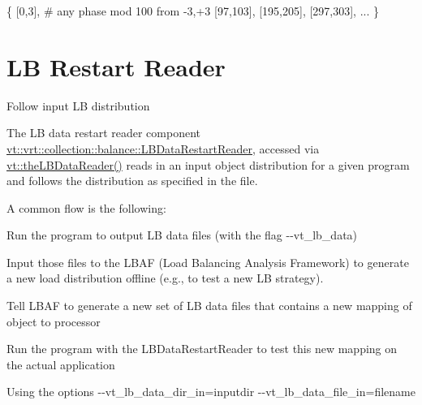 \begin{DoxyCode}
\{
  [0,3], # any phase mod 100 from -3,+3
  [97,103],
  [195,205],
  [297,303], ...
\}
\end{DoxyCode}
 \hypertarget{lb-data-reader}{}\section{LB Restart Reader}\label{lb-data-reader}
Follow input LB distribution

The LB data restart reader component {\ttfamily \hyperlink{structvt_1_1vrt_1_1collection_1_1balance_1_1_l_b_data_restart_reader}{vt\+::vrt\+::collection\+::balance\+::\+L\+B\+Data\+Restart\+Reader}}, accessed via {\ttfamily \hyperlink{namespacevt_a6dc000b04e41df77184588b50280b312}{vt\+::the\+L\+B\+Data\+Reader()}} reads in an input object distribution for a given program and follows the distribution as specified in the file.

A common flow is the following\+:
\begin{DoxyItemize}
\item Run the program to output LB data files (with the flag {\ttfamily -\/-\/vt\+\_\+lb\+\_\+data})
\item Input those files to the L\+B\+AF (Load Balancing Analysis Framework) to generate a new load distribution offline (e.\+g., to test a new LB strategy).
\begin{DoxyItemize}
\item Tell L\+B\+AF to generate a new set of LB data files that contains a new mapping of object to processor
\end{DoxyItemize}
\item Run the program with the {\ttfamily L\+B\+Data\+Restart\+Reader} to test this new mapping on the actual application
\begin{DoxyItemize}
\item Using the options {\ttfamily -\/-\/vt\+\_\+lb\+\_\+data\+\_\+dir\+\_\+in=inputdir -\/-\/vt\+\_\+lb\+\_\+data\+\_\+file\+\_\+in=filename} 
\end{DoxyItemize}
\end{DoxyItemize}